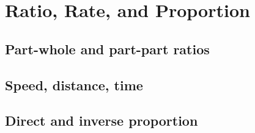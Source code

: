 
\section{Ratio, Rate, and Proportion}

\subsection{Part-whole and part-part ratios}


\subsection{Speed, distance, time}


\subsection{Direct and inverse proportion}

